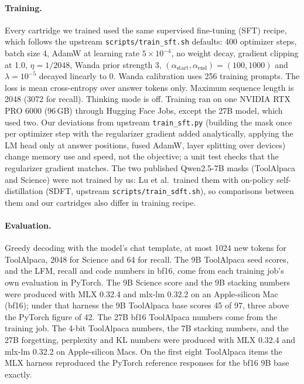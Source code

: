 \documentclass[11pt]{article}
\begin{document}
\paragraph{Training.} Every cartridge we trained used the same supervised fine-tuning (SFT) recipe, which follows the upstream \texttt{scripts/train\_sft.sh} defaults: 400 optimizer steps, batch size 4, AdamW at learning rate $5\times10^{-4}$, no weight decay, gradient clipping at 1.0, $\eta = 1/2048$, Wanda prior strength 3, $(\alpha_\text{start},\alpha_\text{end}) = (100, 1000)$ and $\lambda = 10^{-5}$ decayed linearly to 0. Wanda calibration uses 256 training prompts. The loss is mean cross-entropy over answer tokens only. Maximum sequence length is 2048 (3072 for recall). Thinking mode is off. Training ran on one NVIDIA RTX PRO 6000 (96\,GB) through Hugging Face Jobs, except the 27B model, which used two. Our deviations from upstream \texttt{train\_sft.py} (building the mask once per optimizer step with the regularizer gradient added analytically, applying the LM head only at answer positions, fused AdamW, layer splitting over devices) change memory use and speed, not the objective; a unit test checks that the regularizer gradient matches. The two published Qwen2.5-7B masks (ToolAlpaca and Science) were not trained by us: Lu et al.\ trained them with on-policy self-distillation (SDFT, upstream \texttt{scripts/train\_sdft.sh}), so comparisons between them and our cartridges also differ in training recipe.

\paragraph{Evaluation.} Greedy decoding with the model's chat template, at most 1024 new tokens for ToolAlpaca, 2048 for Science and 64 for recall. The 9B ToolAlpaca seed scores, and the LFM, recall and code numbers in bf16, come from each training job's own evaluation in PyTorch. The 9B Science score and the 9B stacking numbers were produced with MLX 0.32.4 and mlx-lm 0.32.2 on an Apple-silicon Mac (bf16); under that harness the 9B ToolAlpaca base scores 45 of 97, three above the PyTorch figure of 42. The 27B bf16 ToolAlpaca numbers come from the training job. The 4-bit ToolAlpaca numbers, the 7B stacking numbers, and the 27B forgetting, perplexity and KL numbers were produced with MLX 0.32.4 and mlx-lm 0.32.2 on Apple-silicon Macs. On the first eight ToolAlpaca items the MLX harness reproduced the PyTorch reference responses for the bf16 9B base exactly.
\end{document}
